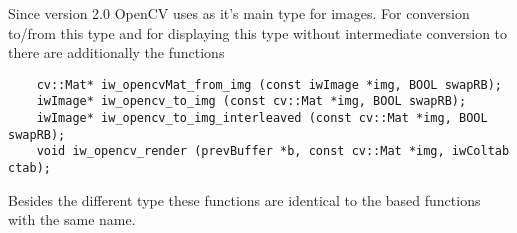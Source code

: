 Since version 2.0 OpenCV uses  as it's main type
for images. For conversion to/from this type and for displaying this
type without intermediate conversion to  there are
additionally the functions
\begin{small}
\linespread{0.9}
\begin{verbatim}
    cv::Mat* iw_opencvMat_from_img (const iwImage *img, BOOL swapRB);
    iwImage* iw_opencv_to_img (const cv::Mat *img, BOOL swapRB);
    iwImage* iw_opencv_to_img_interleaved (const cv::Mat *img, BOOL swapRB);
    void iw_opencv_render (prevBuffer *b, const cv::Mat *img, iwColtab ctab);
\end{verbatim}
\end{small}
Besides the different type these functions are identical to the
 based functions with the same name.


